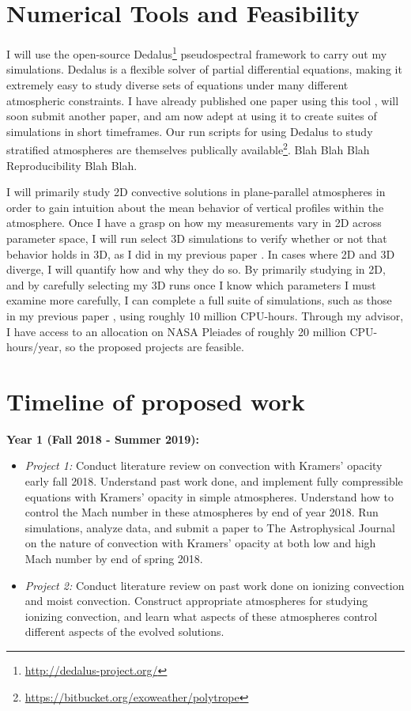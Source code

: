 \documentclass[aasms,12pt]{article}
\begin{document}
\section{Numerical Tools and Feasibility}
I will use the open-source Dedalus\footnote{\url{http://dedalus-project.org/}} pseudospectral framework 
\citep{burns&all2016} to carry out my simulations.  
Dedalus is a flexible solver of partial differential equations,
making it extremely easy to study diverse sets of equations under many different atmospheric
constraints.  I have already published one paper using this tool \citep{anders&brown2017},
will soon submit another paper, and am now adept at using it to create suites of simulations
in short timeframes. Our run scripts for using Dedalus to study stratified atmospheres
are themselves publically available\footnote{\url{https://bitbucket.org/exoweather/polytrope}}.
Blah Blah Blah Reproducibility Blah Blah.

I will primarily study 2D convective solutions in plane-parallel atmospheres in order to gain
intuition about the mean behavior of vertical profiles within the atmosphere.  Once I have a grasp
on how my measurements vary in 2D across parameter space, I will run select 3D simulations to
verify whether or not that behavior holds in 3D, as I did in my previous paper \citep{anders&brown2017}.
In cases where 2D and 3D diverge, I will quantify how and why they do so.
By primarily studying in 2D, and by carefully
selecting my 3D runs once I know which parameters I must examine more carefully, I can complete
a full suite of simulations, such as those in my previous paper \citep{anders&brown2017}, using
roughly 10 million CPU-hours.  Through my advisor, I have access to an allocation on NASA Pleiades
of roughly 20 million CPU-hours/year, so the proposed projects are feasible.



\section{Timeline of proposed work}
\textbf{Year 1 (Fall 2018 - Summer 2019):}
\begin{itemize}
\vspace{-0.2cm}
\item \emph{Project 1:} Conduct literature review on convection with Kramers' opacity early fall 2018.  
Understand past work done, and implement fully compressible equations with Kramers'
opacity in simple atmospheres.  Understand how to control the Mach number in these
atmospheres by end of year 2018.  Run simulations, analyze data, and submit a paper to The Astrophysical Journal
on the nature of convection with Kramers' opacity at both low and high Mach number by
end of spring 2018.
\vspace{-0.2cm}
\item \emph{Project 2:} Conduct literature review on past work done on ionizing convection and moist convection.
Construct appropriate atmospheres for studying ionizing convection, and learn what aspects of
these atmospheres control different aspects of the evolved solutions.
\end{itemize}
\end{document}
